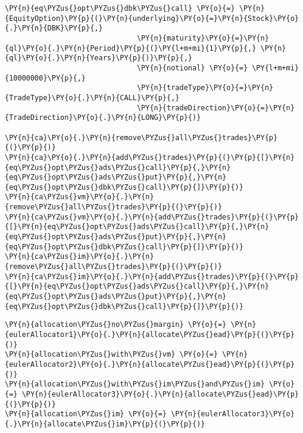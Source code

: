     \begin{tcolorbox}[breakable, size=fbox, boxrule=1pt, pad at break*=1mm,colback=cellbackground, colframe=cellborder]
\begin{Verbatim}[commandchars=\\\{\}]
\PY{n}{eq\PYZus{}opt\PYZus{}dbk\PYZus{}call} \PY{o}{=} \PY{n}{EquityOption}\PY{p}{(}\PY{n}{underlying}\PY{o}{=}\PY{n}{Stock}\PY{o}{.}\PY{n}{DBK}\PY{p}{,}
                               \PY{n}{maturity}\PY{o}{=}\PY{n}{ql}\PY{o}{.}\PY{n}{Period}\PY{p}{(}\PY{l+m+mi}{1}\PY{p}{,} \PY{n}{ql}\PY{o}{.}\PY{n}{Years}\PY{p}{)}\PY{p}{,}
                               \PY{n}{notional} \PY{o}{=} \PY{l+m+mi}{10000000}\PY{p}{,}
                               \PY{n}{tradeType}\PY{o}{=}\PY{n}{TradeType}\PY{o}{.}\PY{n}{CALL}\PY{p}{,}
                               \PY{n}{tradeDirection}\PY{o}{=}\PY{n}{TradeDirection}\PY{o}{.}\PY{n}{LONG}\PY{p}{)}

\PY{n}{ca}\PY{o}{.}\PY{n}{remove\PYZus{}all\PYZus{}trades}\PY{p}{(}\PY{p}{)}
\PY{n}{ca}\PY{o}{.}\PY{n}{add\PYZus{}trades}\PY{p}{(}\PY{p}{[}\PY{n}{eq\PYZus{}opt\PYZus{}ads\PYZus{}call}\PY{p}{,}\PY{n}{eq\PYZus{}opt\PYZus{}ads\PYZus{}put}\PY{p}{,}\PY{n}{eq\PYZus{}opt\PYZus{}dbk\PYZus{}call}\PY{p}{]}\PY{p}{)}
\PY{n}{ca\PYZus{}vm}\PY{o}{.}\PY{n}{remove\PYZus{}all\PYZus{}trades}\PY{p}{(}\PY{p}{)}
\PY{n}{ca\PYZus{}vm}\PY{o}{.}\PY{n}{add\PYZus{}trades}\PY{p}{(}\PY{p}{[}\PY{n}{eq\PYZus{}opt\PYZus{}ads\PYZus{}call}\PY{p}{,}\PY{n}{eq\PYZus{}opt\PYZus{}ads\PYZus{}put}\PY{p}{,}\PY{n}{eq\PYZus{}opt\PYZus{}dbk\PYZus{}call}\PY{p}{]}\PY{p}{)}
\PY{n}{ca\PYZus{}im}\PY{o}{.}\PY{n}{remove\PYZus{}all\PYZus{}trades}\PY{p}{(}\PY{p}{)}
\PY{n}{ca\PYZus{}im}\PY{o}{.}\PY{n}{add\PYZus{}trades}\PY{p}{(}\PY{p}{[}\PY{n}{eq\PYZus{}opt\PYZus{}ads\PYZus{}call}\PY{p}{,}\PY{n}{eq\PYZus{}opt\PYZus{}ads\PYZus{}put}\PY{p}{,}\PY{n}{eq\PYZus{}opt\PYZus{}dbk\PYZus{}call}\PY{p}{]}\PY{p}{)}
\end{Verbatim}
\end{tcolorbox}

    \begin{tcolorbox}[breakable, size=fbox, boxrule=1pt, pad at break*=1mm,colback=cellbackground, colframe=cellborder]
\begin{Verbatim}[commandchars=\\\{\}]
\PY{n}{allocation\PYZus{}no\PYZus{}margin} \PY{o}{=} \PY{n}{eulerAllocator1}\PY{o}{.}\PY{n}{allocate\PYZus{}ead}\PY{p}{(}\PY{p}{)}
\PY{n}{allocation\PYZus{}with\PYZus{}vm} \PY{o}{=} \PY{n}{eulerAllocator2}\PY{o}{.}\PY{n}{allocate\PYZus{}ead}\PY{p}{(}\PY{p}{)}
\PY{n}{allocation\PYZus{}with\PYZus{}im\PYZus{}and\PYZus{}im} \PY{o}{=} \PY{n}{eulerAllocator3}\PY{o}{.}\PY{n}{allocate\PYZus{}ead}\PY{p}{(}\PY{p}{)}
\PY{n}{allocation\PYZus{}im} \PY{o}{=} \PY{n}{eulerAllocator3}\PY{o}{.}\PY{n}{allocate\PYZus{}im}\PY{p}{(}\PY{p}{)}
\end{Verbatim}
\end{tcolorbox}

